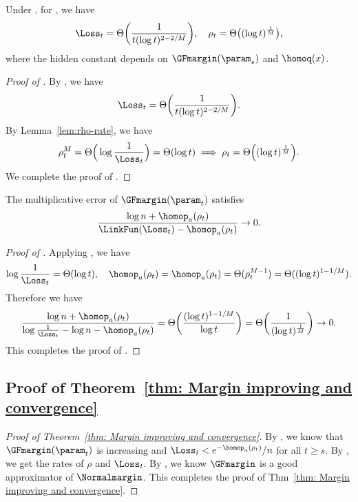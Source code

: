  
 \begin{theorem}
 \label{thm:rate-rho-L}
 Under , for , we have
 \[
    \Loss_t = \Theta \bigg( \frac{1}{t(\log t)^{2-2/M}} \bigg), \quad \rho_t = \Theta \big(     (\log t)^{\frac{1}{M}} \big),
 \]
where the hidden constant depends on $\GFmargin(\param_s)$ and $\homoq(x)$.
 \end{theorem}
 \begin{proof}[Proof of ]
    By , we have
    \[
        \Loss_t = \Theta \bigg( \frac{1}{t(\log t)^{2-2/M}} \bigg).
    \] 
    By Lemma~\ref{lem:rho-rate}, we have 
    \[
        \rho_t^M = \Theta \Big( \log \frac{1}{\Loss_t} \Big) = \Theta ( \log t ) \implies \rho_t = \Theta \Big( (\log t)^{\frac{1}{M}} \Big).
    \]
    We complete the proof of . 
 \end{proof}


\begin{lemma}
\label{lem:eps}
The multiplicative error of $\GFmargin(\param_t)$ satisfies
\[
    \frac{\log n + \homop_a(\rho_t)}{\LinkFun(\Loss_t) -\homop_a(\rho_t)} 
    \to 0.
\]
\end{lemma}
\begin{proof}[Proof of ]
Applying , we have 
\[
    \log \frac{1}{\Loss_t} = \Theta(\log t), \quad \homop_a(\rho_t) = \homop_a(\rho_t) = \Theta( \rho_t^{M-1}) = \Theta( (\log t)^{1-1/M}).
\]
Therefore we have 
\[
    \frac{\log n + \homop_a(\rho_t)}{\log \frac{1}{\Loss_t} -\log n -\homop_a(\rho_t)} = \Theta \bigg( \frac{(\log t)^{1-1/M}}{\log t} \bigg) = \Theta \bigg( \frac{1}{(\log t)^{\frac{1}{M}}}\bigg)\to 0.
\]
This completes the proof of .
\end{proof}


\subsection{Proof of Theorem~\ref{thm: Margin improving and convergence}} \label{sec:proof:thm1}
\begin{proof}[Proof of Theorem~\ref{thm: Margin improving and convergence}]

    By , we know that $\GFmargin(\param_t)$ is increasing and $\Loss_t < e^{-\homop_a(\rho_t)}/n$ for all $t\ge s$.  By , we get the rates of $\rho$ and $\Loss_t$. By , we know $\GFmargin$ is a good approximator of $\Normalmargin$. This completes the proof of Thm~\ref{thm: Margin improving and convergence}. 
\end{proof}

